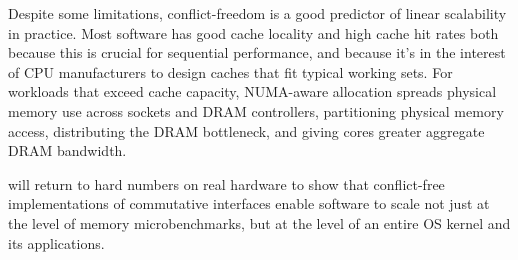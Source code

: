 Despite some limitations, conflict-freedom is a good predictor
of linear scalability in practice.  Most software has good cache
locality and
high cache hit rates both because this is crucial for sequential
performance, and because it's in the interest of CPU manufacturers to
design caches that fit typical working sets.  For workloads that
exceed cache capacity, NUMA-aware allocation spreads physical memory
use across sockets and DRAM controllers, partitioning physical memory
access, distributing the DRAM bottleneck, and giving cores greater
aggregate DRAM bandwidth.

 will return to hard numbers on real hardware to show
that conflict-free implementations of commutative interfaces enable
software to scale not just at the level of memory microbenchmarks, but
at the level of an entire OS kernel and its applications.





